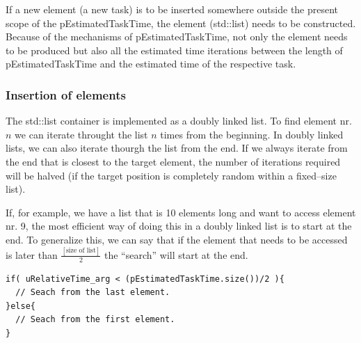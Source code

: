 
	If a new element (a new task) is to be inserted somewhere outside the present scope of the pEstimatedTaskTime, the element (std::list) needs to be constructed.
	Because of the mechanisms of pEstimatedTaskTime, not only the element needs to be produced but also all the estimated time iterations between the length of pEstimatedTaskTime and the estimated time of the respective task.

	
	\subsubsection{Insertion of elements}
	The std::list container is implemented as a doubly linked list\cite{Stroustrup2000KAP16}.
	To find element nr. $n$ we can iterate throught the list $n$ times from the beginning.
	In doubly linked lists, we can also iterate thourgh the list from the end.
	If we always iterate from the end that is closest to the target element, the number of iterations required will be halved (if the target position is completely random within a fixed--size list).

	If, for example, we have a list that is 10 elements long and want to access element nr. 9, the most efficient way of doing this in a doubly linked list is to start at the end.
	To generalize this, we can say that if the element that needs to be accessed is later than $\frac{[\text{size of list}]}{2}$ the ``search'' will start at the end.

\begin{lstlisting}
if( uRelativeTime_arg < (pEstimatedTaskTime.size())/2 ){
  // Seach from the last element.
}else{
  // Seach from the first element.
}
\end{lstlisting}

